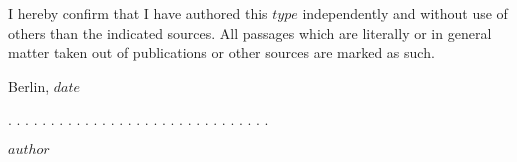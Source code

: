 \documentclass[a4paper,12pt]{article}
\newcommand{\thesistype}{$type$}
\newcommand{\thesisauthor}{$author$}
\newcommand{\thesisdate}{$date$}
\begin{document}
I hereby confirm that I have authored this \thesistype{} independently and
without use of others than the indicated sources. All passages which are
literally or in general matter taken out of publications or other sources are
marked as such.
\vspace{1cm}

Berlin, \thesisdate{}
\vspace{3cm}

. . . . . . . . . . . . . . . . . . . . . . . . . . . . . . .
\vspace{0.1cm}

\thesisauthor{}
\end{document}
